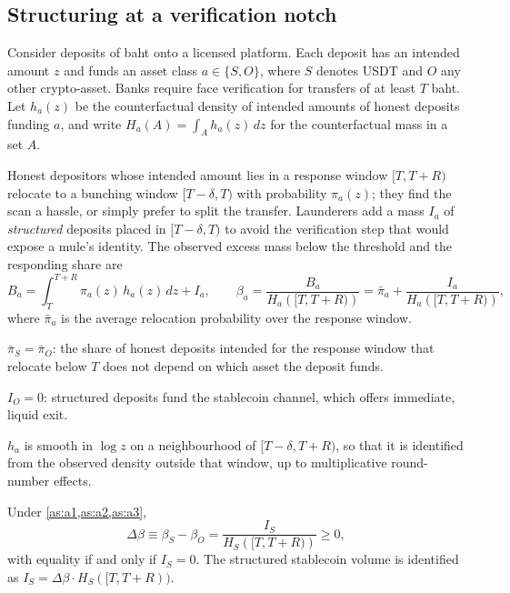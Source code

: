 \subsection{Structuring at a verification notch}\label{sec:bunching}

Consider deposits of baht onto a licensed platform. Each deposit has an intended amount $z$ and funds an asset class
$a\in\{S,O\}$, where $S$ denotes USDT and $O$ any other crypto-asset. Banks require face verification for transfers of
at least $T$ baht. Let $h_a(z)$ be the counterfactual density of intended amounts of honest deposits funding $a$, and
write $H_a(A)=\int_A h_a(z)\,dz$ for the counterfactual mass in a set $A$.

Honest depositors whose intended amount lies in a response window $[T,T+R)$ relocate to a bunching window $[T-\delta,T)$
with probability $\pi_a(z)$; they find the scan a hassle, or simply prefer to split the transfer. Launderers add a mass
$I_a$ of \emph{structured} deposits placed in $[T-\delta,T)$ to avoid the verification step that would expose a mule's
identity. The observed excess mass below the threshold and the responding share are
\begin{equation}\label{eq:excess}
B_a=\int_T^{T+R}\pi_a(z)\,h_a(z)\,dz + I_a,
\qquad
\beta_a=\frac{B_a}{H_a\!\left([T,T+R)\right)}=\bar\pi_a+\frac{I_a}{H_a\!\left([T,T+R)\right)},
\end{equation}
where $\bar\pi_a$ is the average relocation probability over the response window.

\begin{assumption}\label{as:a1}
$\bar\pi_S=\bar\pi_O$: the share of honest deposits intended for the response window that relocate below $T$ does
not depend on which asset the deposit funds.
\end{assumption}
\begin{assumption}\label{as:a2}
$I_O=0$: structured deposits fund the stablecoin channel, which offers immediate, liquid exit.
\end{assumption}
\begin{assumption}\label{as:a3}
$h_a$ is smooth in $\log z$ on a neighbourhood of $[T-\delta,T+R)$, so that it is identified from the observed density
outside that window, up to multiplicative round-number effects.
\end{assumption}

\begin{proposition}\label{prop:bunching}
Under \cref{as:a1,as:a2,as:a3},
\[
\Delta\beta\equiv\beta_S-\beta_O=\frac{I_S}{H_S\!\left([T,T+R)\right)}\geq 0,
\]
with equality if and only if $I_S=0$. The structured stablecoin volume is identified as
$I_S=\Delta\beta\cdot H_S([T,T+R))$.
\end{proposition}

